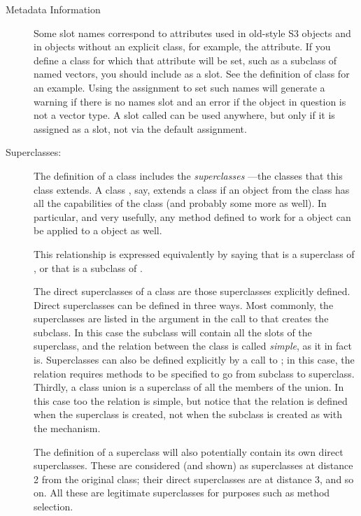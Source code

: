 \begin{Section}{Metadata Information}
\begin{description}
Some slot names correspond to attributes used in old-style S3
objects and in \R{} objects without an explicit class, for
example, the  attribute.  If you define a class for
which that attribute will be set, such as a subclass of named
vectors, you should include  as a slot.  See the
definition of class  for an example.  Using the
 assignment to set such names will generate a
warning if there is no names slot and an error if the object in
question is not a vector type.  A slot called  can
be used anywhere, but only if it is assigned as a slot, not via
the default  assignment.


\item[Superclasses:] 

The definition of a class includes the \emph{superclasses} ---the
classes that this class extends.  A
class , say, extends a class  if an
object from the  class has all the capabilities of
the  class (and probably some more as well).  In
particular, and very usefully, any method defined to work for a
 object can be applied to a  object as
well.

This relationship is expressed equivalently by saying that
 is a superclass of , or that
 is a subclass of .

The direct superclasses of a class are those superclasses
explicitly defined.   Direct superclasses can be defined in
three ways.  Most commonly, the superclasses are listed in the
 argument in the call to 
that creates the subclass.   In this case the subclass will
contain all the slots of the superclass, and the relation
between the class is called \emph{simple}, as it in fact is.
Superclasses can also be defined
explicitly by a call to ; in this case, the
relation requires methods to be specified to go from subclass to
superclass.   Thirdly, a class union is a superclass of all the
members of the union.  In this case too the relation is simple,
but notice that the relation is defined when the superclass is
created, not when the subclass is created as with the
 mechanism.

The definition of a superclass will also potentially contain
its own direct superclasses.  These are considered (and shown) as
superclasses at distance 2 from the original class; their direct
superclasses are at distance 3, and so on.  All these are
legitimate superclasses for purposes such as method selection.


\end{description}
\end{Section}

